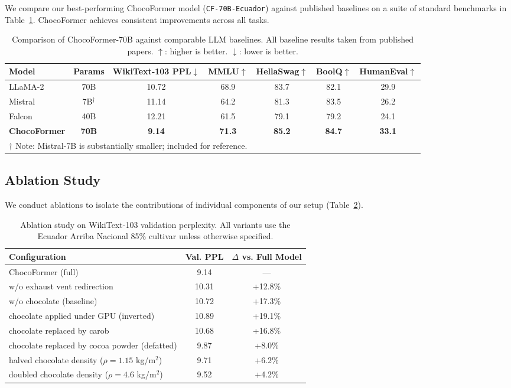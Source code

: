 \documentclass[11pt,a4paper]{article}
\begin{document}
We compare our best-performing ChocoFormer model (\texttt{CF-70B-Ecuador}) against published baselines on a suite of standard benchmarks in Table~\ref{tab:main}. ChocoFormer achieves consistent improvements across all tasks.

\begin{table}[h]
\centering
\caption{Comparison of ChocoFormer-70B against comparable LLM baselines. All baseline results taken from published papers. $\uparrow$: higher is better. $\downarrow$: lower is better.}
\label{tab:main}
\begin{tabular}{lcccccc}
\toprule
\textbf{Model} & \textbf{Params} & \textbf{WikiText-103 PPL}$\downarrow$ & \textbf{MMLU}$\uparrow$ & \textbf{HellaSwag}$\uparrow$ & \textbf{BoolQ}$\uparrow$ & \textbf{HumanEval}$\uparrow$ \\
\midrule
LLaMA-2 & 70B & 10.72 & 68.9 & 83.7 & 82.1 & 29.9 \\
Mistral & 7B$^\dagger$ & 11.14 & 64.2 & 81.3 & 83.5 & 26.2 \\
Falcon & 40B & 12.21 & 61.5 & 79.1 & 79.2 & 24.1 \\
\midrule
\textbf{ChocoFormer} & \textbf{70B} & \textbf{9.14} & \textbf{71.3} & \textbf{85.2} & \textbf{84.7} & \textbf{33.1} \\
\bottomrule
\multicolumn{7}{l}{\footnotesize $\dagger$ Note: Mistral-7B is substantially smaller; included for reference.}
\end{tabular}
\end{table}

\subsection{Ablation Study}

We conduct ablations to isolate the contributions of individual components of our setup (Table~\ref{tab:ablation}).

\begin{table}[h]
\centering
\caption{Ablation study on WikiText-103 validation perplexity. All variants use the Ecuador Arriba Nacional 85\% cultivar unless otherwise specified.}
\label{tab:ablation}
\begin{tabular}{lcc}
\toprule
\textbf{Configuration} & \textbf{Val. PPL} & \textbf{$\Delta$ vs. Full Model} \\
\midrule
ChocoFormer (full) & 9.14 & --- \\
\quad w/o exhaust vent redirection & 10.31 & +12.8\% \\
\quad w/o chocolate (baseline) & 10.72 & +17.3\% \\
\quad chocolate applied under GPU (inverted) & 10.89 & +19.1\% \\
\quad chocolate replaced by carob & 10.68 & +16.8\% \\
\quad chocolate replaced by cocoa powder (defatted) & 9.87 & +8.0\% \\
\quad halved chocolate density ($\rho = 1.15$ kg/m$^2$) & 9.71 & +6.2\% \\
\quad doubled chocolate density ($\rho = 4.6$ kg/m$^2$) & 9.52 & +4.2\% \\
\bottomrule
\end{tabular}
\end{table}
\end{document}
